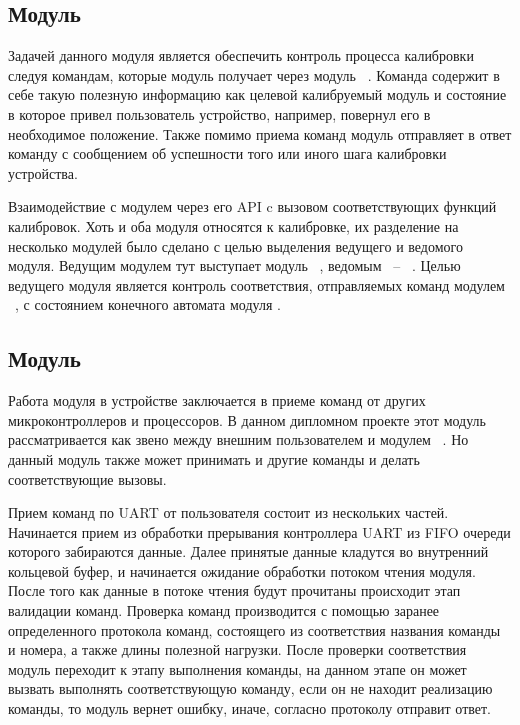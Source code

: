 

\subsection{Модуль \moduleCalibControl}

Задачей данного модуля является обеспечить контроль процесса калибровки следуя командам, которые модуль получает
через модуль \moduleUart~. Команда содержит в себе такую полезную информацию как целевой калибруемый модуль и состояние 
в которое привел пользователь устройство, например, повернул его в необходимое положение. Также помимо приема команд 
модуль отправляет в ответ команду с сообщением об успешности того или иного шага калибровки устройства.

Взаимодействие с модулем \moduleCalib через его API c вызовом соответствующих функций калибровок. Хоть и оба модуля относятся к калибровке,
их разделение на несколько модулей было сделано с целью выделения ведущего и ведомого модуля. Ведущим модулем тут выступает модуль \moduleCalibControl~, 
ведомым ~-- \moduleCalib~. Целью ведущего модуля является контроль соответствия, отправляемых команд модулем \moduleUart~, с состоянием конечного 
автомата модуля \moduleCalib. 


\subsection{Модуль \moduleUart}

Работа модуля в устройстве заключается в приеме команд от других микроконтроллеров и процессоров. В данном дипломном проекте
этот модуль рассматривается как звено между внешним пользователем и модулем \moduleCalib~. Но данный модуль также может принимать
и другие команды и делать соответствующие вызовы. 

Прием команд по UART от пользователя состоит из нескольких частей. Начинается прием из обработки прерывания контроллера UART из 
FIFO очереди которого забираются данные. Далее принятые данные кладутся во внутренний кольцевой буфер, и начинается ожидание обработки
потоком чтения модуля. После того как данные в потоке чтения будут прочитаны происходит этап валидации команд. 
Проверка команд производится с помощью заранее определенного протокола команд, состоящего из соответствия названия команды и номера, 
а также длины полезной нагрузки. После проверки соответствия модуль переходит к этапу выполнения команды, на данном этапе он может вызвать
выполнять соответствующую команду, если он не находит реализацию команды, то модуль вернет ошибку, иначе, согласно протоколу отправит ответ.


